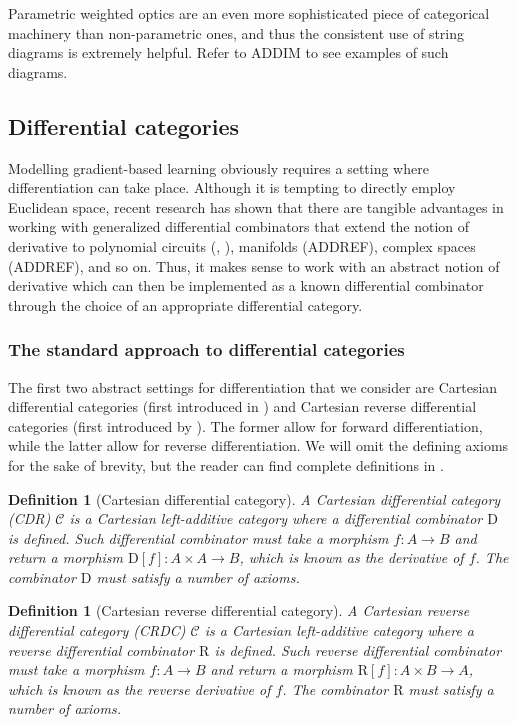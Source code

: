 \documentclass[12pt,a4paper,openright,twoside]{report}
\theoremstyle{plain}
\newtheorem{definition}[proposition]{Definition}
\theoremstyle{definition}
\begin{document}
Parametric weighted optics are an even more sophisticated piece of categorical machinery than non-parametric ones, and thus the consistent use of string diagrams is extremely helpful. Refer to ADDIM to see examples of such diagrams.


\subsection{Differential categories}
\label{subsec: diffcats}


Modelling gradient-based learning obviously requires a setting where differentiation can take place. Although it is tempting to directly employ Euclidean space, recent research has shown that there are tangible advantages in working with generalized differential combinators that extend the notion of derivative to polynomial circuits (\cite{wilson2022categories}, \cite{wilson2021reverse}), manifolds (ADDREF), complex spaces (ADDREF), and so on. 
Thus, it makes sense to work with an abstract notion of derivative which can then be implemented as a known differential combinator through the choice of an appropriate differential category.


\subsubsection{The standard approach to differential categories}


The first two abstract settings for differentiation that we consider are Cartesian differential categories (first introduced in \cite{blute2006differential}) and Cartesian reverse differential categories (first introduced by \cite{cockett2019reverse}). The former allow for forward differentiation, while the latter allow for reverse differentiation. We will omit the defining axioms for the sake of brevity, but the reader can find complete definitions in \cite{cockett2019reverse}.

\begin{definition}[Cartesian differential category]
  A Cartesian differential category (CDR) $\mathcal{C}$ is a Cartesian left-additive category where a differential combinator $\mathrm{D}$ is defined. Such differential combinator must take a morphism $f: A \to B$ and return a morphism $\mathrm{D}[f]: A \times A \to B$, which is known as the derivative of $f$. The combinator $\mathrm{D}$ must satisfy a number of axioms. 
\end{definition}

\begin{definition}[Cartesian reverse differential category]
  A Cartesian reverse differential category (CRDC) $\mathcal{C}$ is a Cartesian left-additive category where a reverse differential combinator $\mathrm{R}$ is defined. Such reverse differential combinator must take a morphism $f: A \to B$ and return a morphism $\mathrm{R}[f]: A \times B \to A$, which is known as the reverse derivative of $f$. The combinator $\mathrm{R}$ must satisfy a number of axioms. 
\end{definition}
\end{document}
